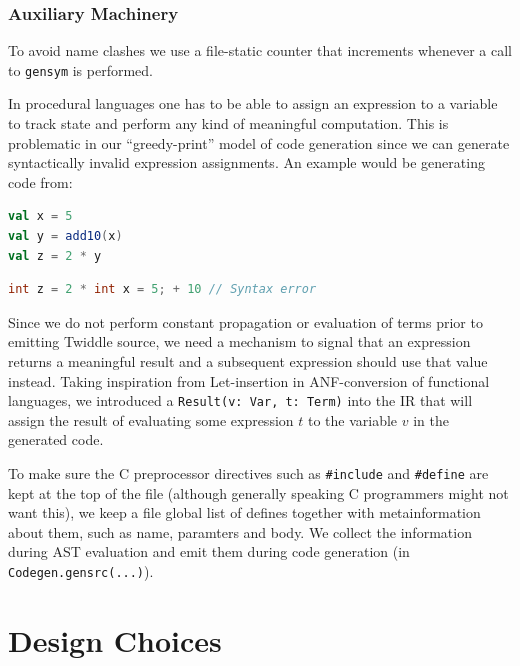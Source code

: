 \documentclass{article}
\begin{document}
\subsubsection{Auxiliary Machinery}
To avoid name clashes we use a file-static counter that increments whenever a call to \texttt{gensym} is performed.

In procedural languages one has to be able to assign an expression to a variable to track state and perform any kind of meaningful computation. This is problematic in our ``greedy-print'' model of code generation since we can generate syntactically invalid expression assignments. An example would be generating code from:
\begin{lstlisting}[language=Scala]
val x = 5
val y = add10(x)
val z = 2 * y
\end{lstlisting}
\begin{lstlisting}[language=C]
int z = 2 * int x = 5; + 10 // Syntax error
\end{lstlisting} Since we do not perform constant propagation or evaluation of terms prior to emitting Twiddle source, we need a mechanism to signal that an expression returns a meaningful result and a subsequent expression should use that value instead. Taking inspiration from Let-insertion in ANF-conversion of functional languages, we introduced a \texttt{Result(v: Var, t: Term)} into the IR that will assign the result of evaluating some expression $t$ to the variable $v$ in the generated code.


To make sure the C preprocessor directives such as \texttt{\#include} and \texttt{\#define} are kept at the top of the file (although generally speaking C programmers might not want this), we keep a file global list of defines together with metainformation about them, such as name, paramters and body. We collect the information during AST evaluation and emit them
during code generation (in \texttt{Codegen.gensrc(...)}).
\section{Design Choices}
\end{document}
